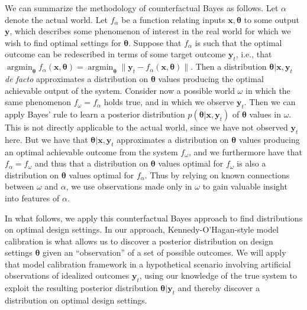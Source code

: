 \documentclass[12pt]{article}
\DeclareMathOperator*{\argmin}{argmin}
\begin{document}

%
We can summarize the methodology of counterfactual Bayes as follows.
%
Let $\alpha$ denote the actual world. 
%
Let $f_\alpha$ be a function relating inputs $\mathbf x,\boldsymbol \theta$ to some output $\mathbf y$, which describes some phenomenon of interest in the real world for which we wish to find optimal settings for $\boldsymbol\theta$. 
%
Suppose that $f_\alpha$ is such that the optimal outcome can be redescribed in terms of some target outcome $\mathbf y_t$, i.e., that $\argmin_{\boldsymbol\theta} f_\alpha(\mathbf x,\boldsymbol \theta)=\argmin_{\boldsymbol\theta} \lVert \mathbf y_{t} - f_\alpha(\mathbf x,\boldsymbol\theta)\rVert$. 
%
Then a distribution $\boldsymbol\theta|\mathbf x,\mathbf y_{t}$ \textit{de facto} approximates a distribution on $\boldsymbol\theta$ values producing the optimal achievable output of the system. 
%
%
Consider now a possible world $\omega$ in which the same phenomenon $f_\omega=f_\alpha$ holds true, and in which we observe $\mathbf y_{t}$. 
%
Then we can apply Bayes' rule to learn a posterior distribution $p(\boldsymbol\theta|\mathbf x,\mathbf y_{t})$ of $\boldsymbol \theta$ values in $\omega$. 
%
This is not directly applicable to the actual world, since we have not observed $\mathbf y_{t}$ here. 
%
But we have that $\boldsymbol\theta|\mathbf x,\mathbf y_{t}$ approximates a distribution on $\boldsymbol \theta$ values producing an optimal achievable outcome from the system $f_\omega$, and we furthermore have that $f_\alpha=f_\omega$ and thus that a distribution on $\boldsymbol \theta$ values optimal for $f_\omega$ is also a distribution on $\boldsymbol \theta$ values optimal for $f_\alpha$. 
%
Thus by relying on known connections between $\omega$ and $\alpha$, we use observations made only in $\omega$ to gain valuable insight into features of $\alpha$.
%

%
In what follows, we apply this counterfactual Bayes approach to find distributions on optimal design settings.
%
In our approach, Kennedy-O'Hagan-style model calibration \citep{Kennedy2001} is what allows us to discover a posterior distribution on design settings $\boldsymbol\theta$ given an ``observation'' of a set of possible outcomes.
%
We will apply that model calibration framework in a hypothetical scenario involving artificial observations of idealized outcomes $\mathbf y_t$, using our knowledge of the true system to exploit the resulting posterior distribution $\boldsymbol\theta|\mathbf y_t$ and thereby discover a distribution on optimal design settings.
%
\end{document}
